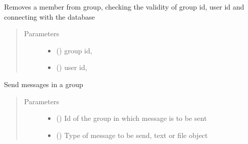 \documentclass[letterpaper,10pt,english]{sphinxmanual}
\begin{document}
\begin{fulllineitems}
\begin{fulllineitems}
\label{\detokenize{Message:Message.Message._rem_grp_mem}}
Removes a member from group, checking the validity of group id, user id and connecting with the database
\begin{quote}\begin{description}
\item[{Parameters}] \leavevmode\begin{itemize}
\item {} 
 (\sphinxstyleliteralemphasis{\sphinxupquote{,}}) \textendash{} group id,

\item {} 
 () \textendash{} user id,

\end{itemize}

\end{description}\end{quote}

\end{fulllineitems}


\begin{fulllineitems}
\label{\detokenize{Message:Message.Message._send_grp_message}}
Send messages in a group
\begin{quote}\begin{description}
\item[{Parameters}] \leavevmode\begin{itemize}
\item {} 
 () \textendash{} Id of the group in which message is to be sent

\item {} 
 () \textendash{} Type of message to be send, text or file object


\end{itemize}
\end{description}
\end{quote}
\end{fulllineitems}
\end{fulllineitems}
\end{document}
